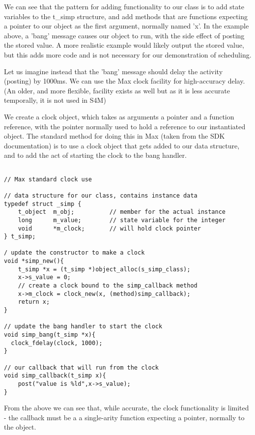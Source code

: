 \documentclass[acmsmall]{acmart}
\begin{document}
{\begin{verbatim}
\end{verbatim}

We can see that the pattern for adding functionality to our class is to
add state variables to the t\_simp structure, and add methods that are
functions expecting a pointer to our object as the first argument,
normally named 'x'. In the example above, a 'bang' message causes our
object to run, with the side effect of posting the stored value. A more
realistic example would likely output the stored value, but this adds more code
and is not necessary for our demonstration of scheduling.

Let us imagine instead that the 'bang' message should delay the activity
(posting) by 1000ms. We can use the Max clock facility for high-accuracy
delay. (An older, and more flexible, facility exists as well but as it is
less accurate temporally, it is not used in S4M) 

We create a clock object, which takes as arguments a pointer and a function
reference, with the pointer normally used to hold a reference to our instantiated
object. The standard method for doing this in Max (taken from the SDK documentation)
is to use a clock object that gets added to our data structure, and to add the act
of starting the clock to the bang handler.

\begin{verbatim}

// Max standard clock use

// data structure for our class, contains instance data
typedef struct _simp {
    t_object  m_obj;          // member for the actual instance 
    long      m_value;        // state variable for the integer
    void      *m_clock;       // will hold clock pointer
} t_simp;

/ update the constructor to make a clock
void *simp_new(){
    t_simp *x = (t_simp *)object_alloc(s_simp_class);
    x->s_value = 0;
    // create a clock bound to the simp_callback method
    x->m_clock = clock_new(x, (method)simp_callback); 
    return x;
}

// update the bang handler to start the clock
void simp_bang(t_simp *x){
  clock_fdelay(clock, 1000);
}

// our callback that will run from the clock
void simp_callback(t_simp x){
    post("value is %ld",x->s_value);
}

\end{verbatim}

From the above we can see that, while accurate, the clock functionality is limited -
the callback must be a a single-arity function expecting a pointer, normally to the object.


}
\end{document}
